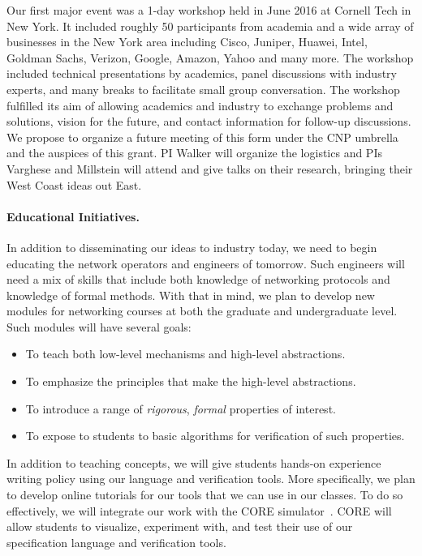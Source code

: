 Our first major event was a 1-day workshop held in June 2016 at
Cornell Tech in New York.  It included roughly 50 participants from
academia and a wide array of businesses in the New York area including
Cisco, Juniper, Huawei, Intel, Goldman Sachs, Verizon, Google, Amazon,
Yahoo and many more.  The workshop included technical presentations by
academics, panel discussions with industry experts, and many breaks to
facilitate small group conversation.  The workshop fulfilled its aim
of allowing academics and industry to exchange problems and solutions,
vision for the future, and contact information for follow-up
discussions. We propose to organize a future meeting of this form
under the CNP umbrella and the auspices of this grant.  PI Walker will
organize the logistics and PIs Varghese and Millstein will attend and
give talks on their research, bringing their West Coast ideas out
East.

\paragraph*{Educational Initiatives.}
In addition to disseminating our ideas to industry today,
we need to begin educating the network operators and engineers 
of tomorrow.  Such engineers will need a mix of skills that include
both knowledge of networking protocols and knowledge of formal methods.
With that in mind, we plan to develop new modules for networking courses
at both the graduate and undergraduate level.  Such modules will have
several goals:

\begin{itemize}
\item To teach both low-level mechanisms and high-level abstractions.
\item To emphasize the principles that make the high-level abstractions.
\item To introduce a range of \emph{rigorous}, \emph{formal} properties of
 interest.
\item To expose to students to basic algorithms for verification of such
properties.
\end{itemize}

In addition to teaching concepts, we will give students hands-on
experience writing policy using our language and verification tools.  
More specifically, we plan to develop online tutorials for our tools
that we can use in our classes.  To do so effectively, we will
integrate our work with the CORE simulator~\cite{core}.  CORE
will allow students to visualize, experiment with, and test their
use of our specification language and verification tools.

